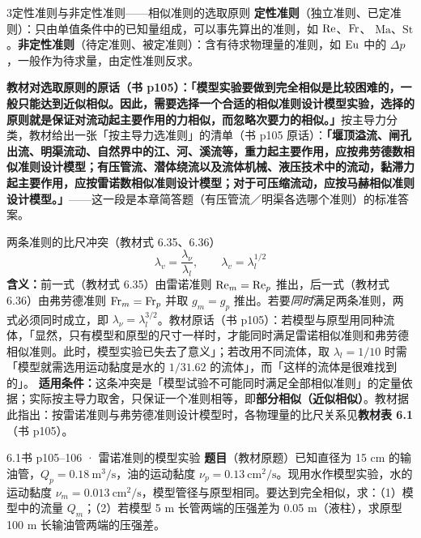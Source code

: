 \begin{kaodian}{3}{定性准则与非定性准则——相似准则的选取原则}
\textbf{定性准则}（独立准则、已定准则）：只由单值条件中的已知量组成，可以事先算出的准则，如 $\mathrm{Re}$、$\mathrm{Fr}$、
$\mathrm{Ma}$、$\mathrm{St}$。\textbf{非定性准则}（待定准则、被定准则）：含有待求物理量的准则，如 $\mathrm{Eu}$ 中的 $\Delta p$，一般作为待求量，由定性准则反求。

\textbf{教材对选取原则的原话（书 p105）：}\textbf{「模型实验要做到完全相似是比较困难的，一般只能达到近似相似。因此，需要选择一个合适的相似准则设计模型实验，选择的原则就是保证对流动起主要作用的力相似，而忽略次要力的相似。」}按主导力分类，教材给出一张「按主导力选准则」的清单（书 p105 原话）：\textbf{「堰顶溢流、闸孔出流、明渠流动、自然界中的江、河、溪流等，重力起主要作用，应按弗劳德数相似准则设计模型；有压管流、潜体绕流以及流体机械、液压技术中的流动，黏滞力起主要作用，应按雷诺数相似准则设计模型；对于可压缩流动，应按马赫相似准则设计模型。」}——这一段是本章简答题（有压管流／明渠各选哪个准则）的标准答案。

\begin{gongshi}{两条准则的比尺冲突（教材式 6.35、6.36）}
\[ \lambda_v=\frac{\lambda_\nu}{\lambda_l},\qquad \lambda_v=\lambda_l^{1/2} \]
\textbf{含义：}前一式（教材式 6.35）由雷诺准则 $\mathrm{Re}_m=\mathrm{Re}_p$ 推出，后一式（教材式 6.36）由弗劳德准则 $\mathrm{Fr}_m=\mathrm{Fr}_p$ 并取 $g_m=g_p$ 推出。若要\emph{同时}满足两条准则，两式必须同时成立，即 $\lambda_\nu=\lambda_l^{3/2}$。教材原话（书 p105）：若模型与原型用同种流体，「显然，只有模型和原型的尺寸一样时，才能同时满足雷诺相似准则和弗劳德相似准则。此时，模型实验已失去了意义」；若改用不同流体，取 $\lambda_l=1/10$ 时需「模型就需选用运动黏度是水的 $1/31.62$ 的流体」，而「这样的流体是很难找到的」。
\textbf{适用条件：}这条冲突是「模型试验不可能同时满足全部相似准则」的定量依据；实际按主导力取舍，只保证一个准则相等，即\textbf{部分相似（近似相似）}。教材据此指出：按雷诺准则与弗劳德准则设计模型时，各物理量的比尺关系见\textbf{教材表 6.1}（书 p105）。
\end{gongshi}

\begin{liti}{6.1}{书 p105--106 · 雷诺准则的模型实验}
\textbf{题目}（教材原题）已知直径为 15 cm 的输油管，$Q_p=0.18\ \mathrm{m^{3}/s}$，油的运动黏度 $\nu_p=0.13\ \mathrm{cm^{2}/s}$。现用水作模型实验，水的运动黏度 $\nu_m=0.013\ \mathrm{cm^{2}/s}$，模型管径与原型相同。要达到完全相似，求：（1）模型中的流量 $Q_m$；（2）若模型 5 m 长管两端的压强差为 0.05 m（液柱），求原型 100 m 长输油管两端的压强差。



\end{liti}
\end{kaodian}
